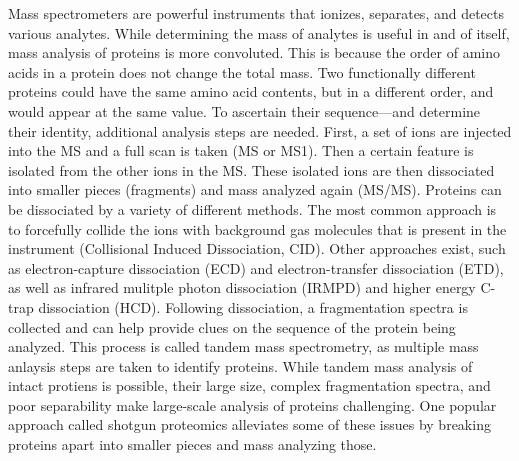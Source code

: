 Mass spectrometers are powerful instruments that ionizes, separates, and detects various analytes. While determining the mass of analytes is useful in and of itself, mass analysis of proteins is more convoluted. This is because the order of amino acids in a protein does not change the total mass. Two functionally different proteins could have the same amino acid contents, but in a different order, and would appear at the same \mz{} value. To ascertain their sequence---and determine their identity, additional analysis steps are needed. First, a set of ions are injected into the MS and a full scan is taken (MS or MS1). Then a certain \mz{} feature is isolated from the other ions in the MS. These isolated ions are then dissociated into smaller pieces (fragments) and mass analyzed again (MS/MS). Proteins can be dissociated by a variety of different methods. The most common approach is to forcefully collide the ions with background gas molecules that is present in the instrument (Collisional Induced Dissociation, CID)\cite{cid}. Other approaches exist, such as electron-capture dissociation (ECD)\cite{ecd} and electron-transfer dissociation (ETD)\cite{etd}, as well as infrared mulitple photon dissociation (IRMPD)\cite{irmpd} and higher energy C-trap dissociation (HCD)\cite{hcd}. Following dissociation, a fragmentation spectra is collected and can help provide clues on the sequence of the protein being analyzed. This process is called tandem mass spectrometry, as multiple mass anlaysis steps are taken to identify proteins. While tandem mass analysis of intact protiens is possible, their large size, complex fragmentation spectra, and poor separability make large-scale analysis of proteins challenging. One popular approach called shotgun proteomics alleviates some of these issues by breaking proteins apart into smaller pieces and mass analyzing those.

